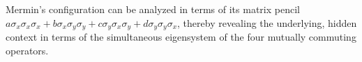 \documentclass[
  twocolumn,
 showpacs,
 showkeys,
 preprintnumbers,
 amsmath,amssymb,
 aps,
 pra,
  longbibliography,
 floatfix,
 ]{revtex4-2}
\newcommand\myotimes{ }
\begin{document}
Mermin's configuration can be analyzed in terms of its matrix pencil
$
a \sigma_x \myotimes  \sigma_x \myotimes  \sigma_x + b \sigma_x \myotimes  \sigma_y \myotimes  \sigma_y + c \sigma_y \myotimes  \sigma_x \myotimes  \sigma_y + d \sigma_y \myotimes  \sigma_y \myotimes  \sigma_x
$,
thereby revealing the underlying, hidden context in terms of
the simultaneous eigensystem of the four mutually commuting operators.
%
%
\end{document}

